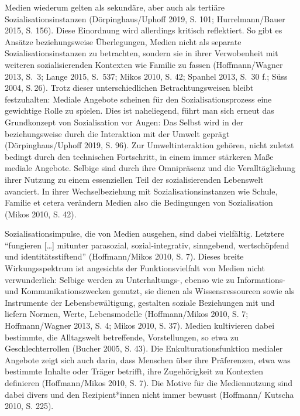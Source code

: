 \documentclass[a4paper,
fontsize=11pt,
oneside,
numbers=noperiodatend,
parskip=half-,
bibliography=totoc,
final
]{scrartcl}
\begin{document}
Medien wiederum gelten als sekundäre, aber auch als tertiäre
Sozialisationsinstanzen (Dörpinghaus/Uphoff 2019, S. 101;
Hurrelmann/Bauer 2015, S. 156). Diese Einordnung wird allerdings
kritisch reflektiert. So gibt es Ansätze beziehungsweise Überlegungen,
Medien nicht als separate Sozialisationsinstanzen zu betrachten, sondern
sie in ihrer Verwobenheit mit weiteren sozialisierenden Kontexten wie
Familie zu fassen (Hoffmann/Wagner 2013, S.~3; Lange 2015, S.~537; Mikos
2010, S. 42; Spanhel 2013, S.~30 f.; Süss 2004, S.\,26). Trotz dieser
unterschiedlichen Betrachtungsweisen bleibt festzuhalten: Mediale
Angebote scheinen für den Sozialisationsprozess eine gewichtige Rolle zu
spielen. Dies ist naheliegend, führt man sich erneut das Grundkonzept
von Sozialisation vor Augen: Das Selbst wird in der beziehungsweise
durch die Interaktion mit der Umwelt geprägt (Dörpinghaus/Uphoff 2019,
S. 96). Zur Umweltinteraktion gehören, nicht zuletzt bedingt durch den
technischen Fortschritt, in einem immer stärkeren Maße mediale Angebote.
Selbige sind durch ihre Omnipräsenz und die Veralltäglichung ihrer
Nutzung zu einem essenziellen Teil der sozialisierenden Lebenswelt
avanciert. In ihrer Wechselbeziehung mit Sozialisationsinstanzen wie
Schule, Familie et cetera verändern Medien also die Bedingungen von
Sozialisation (Mikos 2010, S. 42).

Sozialisationsimpulse, die von Medien ausgehen, sind dabei vielfältig.
Letztere \enquote{fungieren {[}\ldots{]} mitunter parasozial,
sozial-integrativ, sinngebend, wertschöpfend und identitätsstiftend}
(Hoffmann/Mikos 2010, S. 7). Dieses breite Wirkungsspektrum ist
angesichts der Funktionsvielfalt von Medien nicht verwunderlich: Selbige
werden zu Unterhaltungs-, ebenso wie zu Informations- und
Kommunikationszwecken genutzt, sie dienen als Wissensressourcen sowie
als Instrumente der Lebensbewältigung, gestalten soziale Beziehungen mit
und liefern Normen, Werte, Lebensmodelle (Hoffmann/Mikos 2010, S. 7;
Hoffmann/Wagner 2013, S. 4; Mikos 2010, S. 37). Medien kultivieren dabei
bestimmte, die Alltagswelt betreffende, Vorstellungen, so etwa zu
Geschlechterrollen (Bucher 2005, S. 43). Die Enkulturationsfunktion
medialer Angebote zeigt sich auch darin, dass Menschen über ihre
Präferenzen, etwa was bestimmte Inhalte oder Träger betrifft, ihre
Zugehörigkeit zu Kontexten definieren (Hoffmann/Mikos 2010, S. 7). Die
Motive für die Mediennutzung sind dabei divers und den Rezipient*innen
nicht immer bewusst (Hoffmann/ Kutscha 2010, S. 225).
\end{document}
